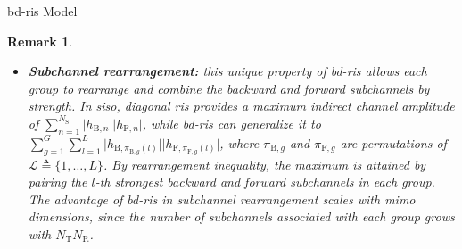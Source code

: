\documentclass[journal]{IEEEtran}
\newtheorem{remark}{Remark}
\begin{document}
\begin{section}{\gls{bd}-\gls{ris} Model}
\begin{remark}
\begin{itemize}
			\item \textbf{Subchannel rearrangement:} this unique property of \gls{bd}-\gls{ris} allows each group to rearrange and combine the backward and forward subchannels by strength. In \gls{siso}, diagonal \gls{ris} provides a maximum indirect channel amplitude of $\sum_{n=1}^{N_\mathrm{S}} \lvert h_{\mathrm{B},n} \rvert \lvert h_{\mathrm{F},n} \rvert$, while \gls{bd}-\gls{ris} can generalize it to $\sum_{g=1}^{G} \sum_{l=1}^{L} \lvert h_{\mathrm{B},\pi_{\mathrm{B},g}(l)} \rvert \lvert h_{\mathrm{F},\pi_{\mathrm{F},g}(l)} \rvert$, where $\pi_{\mathrm{B},g}$ and $\pi_{\mathrm{F},g}$ are permutations of $\mathcal{L} \triangleq \{1, \ldots, L\}$. By rearrangement inequality, the maximum is attained by pairing the $l$-th strongest backward and forward subchannels in each group.
			The advantage of \gls{bd}-\gls{ris} in subchannel rearrangement scales with \gls{mimo} dimensions, since the number of subchannels associated with each group grows with $N_\mathrm{T} N_\mathrm{R}$.

\end{itemize}
\end{remark}
\end{section}
\end{document}
